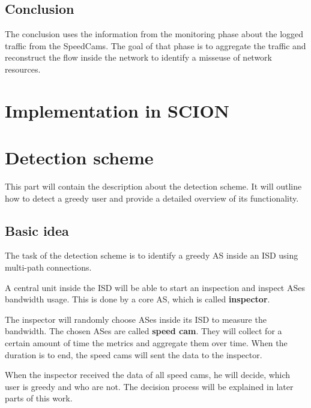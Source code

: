 \documentclass[thesis.tex]{subfiles}
\begin{document}
\subsection{Conclusion}
The conclusion uses the information from the monitoring phase about the logged traffic from the SpeedCams. The goal of that phase is to aggregate the traffic and reconstruct the flow inside the network to identify a misseuse of network resources.



\section{Implementation in SCION} \label{sec:main:scionimpl}
\section{Detection scheme}
This part will contain the description about the detection scheme. It will outline how to detect a greedy user and provide a detailed overview of its functionality.

\subsection{Basic idea}
The task of the detection scheme is to identify a greedy AS inside an ISD using multi-path connections. 

A central unit inside the ISD will be able to start an inspection and inspect ASes bandwidth usage. This is done by a core AS, which is called \textbf{inspector}. 

The inspector will randomly choose ASes inside its ISD to measure the bandwidth. The chosen ASes are called \textbf{speed cam}. They will collect for a certain amount of time the metrics and aggregate them over time. When the duration is to end, the speed cams will sent the data to the inspector.

When the inspector received the data of all speed cams, he will decide, which user is greedy and who are not. The decision process will be explained in later parts of this work.
\end{document}
